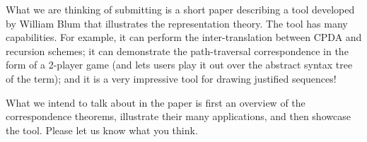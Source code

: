What we are thinking of submitting is a short paper describing a
tool developed by William Blum that illustrates the representation
theory. The tool has many capabilities. For example, it can perform
the inter-translation between CPDA and recursion schemes; it can
demonstrate the path-traversal correspondence in the form of a
2-player game (and lets users play it out over the abstract syntax
tree of the term); and it is a very impressive tool for drawing
justified sequences!

What we intend to talk about in the paper is first an overview of
the correspondence theorems, illustrate their many applications, and
then showcase the tool. Please let us know what you think.





